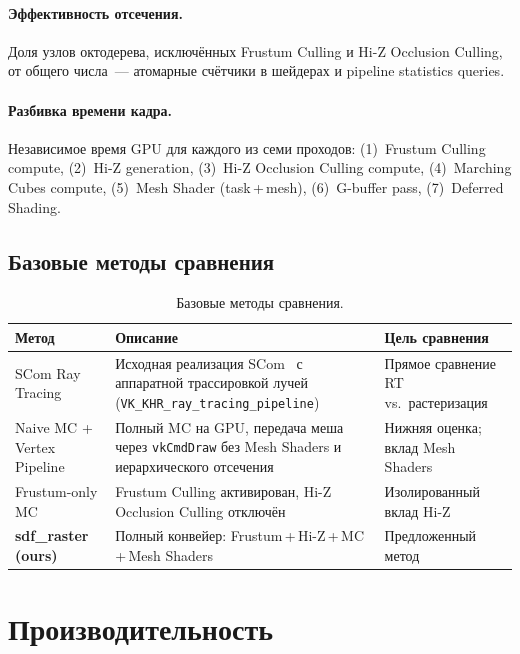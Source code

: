 \paragraph{Эффективность отсечения.}
Доля узлов октодерева, исключённых Frustum Culling и Hi-Z Occlusion Culling,
от общего числа~--- атомарные счётчики в шейдерах и
pipeline statistics queries.

\paragraph{Разбивка времени кадра.}
Независимое время GPU для каждого из семи проходов:
(1)~Frustum Culling compute,
(2)~Hi-Z generation,
(3)~Hi-Z Occlusion Culling compute,
(4)~Marching Cubes compute,
(5)~Mesh Shader (task\,+\,mesh),
(6)~G-buffer pass,
(7)~Deferred Shading.

\subsection{Базовые методы сравнения}

\begin{table}[h]
  \centering
  \caption{Базовые методы сравнения.}
  \label{tab:baselines}
  \begin{tabular}{lp{6cm}p{4.5cm}}
    \toprule
    \textbf{Метод} & \textbf{Описание} & \textbf{Цель сравнения} \\
    \midrule
    SCom Ray Tracing
      & Исходная реализация SCom~\cite{scom2025} с аппаратной трассировкой
        лучей (\texttt{VK\_KHR\_ray\_tracing\_pipeline})
      & Прямое сравнение RT vs.\ растеризация \\[4pt]
    Naive MC + Vertex Pipeline
      & Полный MC на GPU, передача меша через \texttt{vkCmdDraw}
        без Mesh Shaders и иерархического отсечения
      & Нижняя оценка; вклад Mesh Shaders \\[4pt]
    Frustum-only MC
      & Frustum Culling активирован, Hi-Z Occlusion Culling отключён
      & Изолированный вклад Hi-Z \\[4pt]
    \textbf{sdf\_raster (ours)}
      & Полный конвейер: Frustum\,+\,Hi-Z\,+\,MC\,+\,Mesh Shaders
      & Предложенный метод \\
    \bottomrule
  \end{tabular}
\end{table}

\section{Производительность}
\label{sec:performance}


